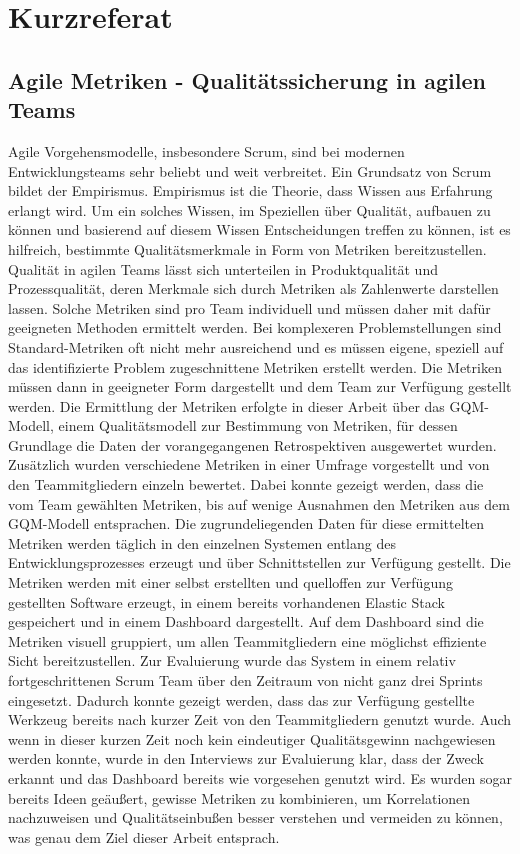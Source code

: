 \newpage
\chapter*{Kurzreferat}
\section*{Agile Metriken {-} Qualitätssicherung in agilen Teams}

Agile Vorgehensmodelle, insbesondere Scrum, sind bei modernen Entwicklungsteams sehr beliebt und weit verbreitet.
Ein Grundsatz von Scrum bildet der Empirismus. 
Empirismus ist die Theorie, dass Wissen aus Erfahrung erlangt wird.
Um ein solches Wissen, im Speziellen über Qualität, aufbauen zu können und basierend auf diesem Wissen Entscheidungen treffen zu können, ist es hilfreich, bestimmte Qualitätsmerkmale in Form von Metriken bereitzustellen.
Qualität in agilen Teams lässt sich unterteilen in Produktqualität und Prozessqualität, deren Merkmale sich durch Metriken als Zahlenwerte darstellen lassen.
Solche Metriken sind pro Team individuell und müssen daher mit dafür geeigneten Methoden ermittelt werden.
Bei komplexeren Problemstellungen sind Standard-Metriken oft nicht mehr ausreichend und es müssen eigene, speziell auf das identifizierte Problem zugeschnittene Metriken erstellt werden.
Die Metriken müssen dann in geeigneter Form dargestellt und dem Team zur Verfügung gestellt werden.
Die Ermittlung der Metriken erfolgte in dieser Arbeit über das \ac{GQM}-Modell, einem Qualitätsmodell zur Bestimmung von Metriken, für dessen Grundlage die Daten der vorangegangenen Retrospektiven ausgewertet wurden.
Zusätzlich wurden verschiedene Metriken in einer Umfrage vorgestellt und von den Teammitgliedern einzeln bewertet.
Dabei konnte gezeigt werden, dass die vom Team gewählten Metriken, bis auf wenige Ausnahmen den Metriken aus dem \ac{GQM}-Modell entsprachen.
Die zugrundeliegenden Daten für diese ermittelten Metriken werden täglich in den einzelnen Systemen entlang des Entwicklungsprozesses erzeugt und über Schnittstellen zur Verfügung gestellt.
Die Metriken werden mit einer selbst erstellten und quelloffen zur Verfügung gestellten Software erzeugt, in einem bereits vorhandenen Elastic Stack gespeichert und in einem Dashboard dargestellt.
Auf dem Dashboard sind die Metriken visuell gruppiert, um allen Teammitgliedern eine möglichst effiziente Sicht bereitzustellen.
Zur Evaluierung wurde das System in einem relativ fortgeschrittenen Scrum Team über den Zeitraum von nicht ganz drei Sprints eingesetzt.
Dadurch konnte gezeigt werden, dass das zur Verfügung gestellte Werkzeug bereits nach kurzer Zeit von den Teammitgliedern genutzt wurde.
Auch wenn in dieser kurzen Zeit noch kein eindeutiger Qualitätsgewinn nachgewiesen werden konnte, wurde in den Interviews zur Evaluierung klar, dass der Zweck erkannt und das Dash\-board bereits wie vorgesehen genutzt wird.
Es wurden sogar bereits Ideen geäußert, gewisse Metriken zu kombinieren, um Korrelationen nachzuweisen und Qualitätseinbußen besser verstehen und vermeiden zu können, was genau dem Ziel dieser Arbeit entsprach.

